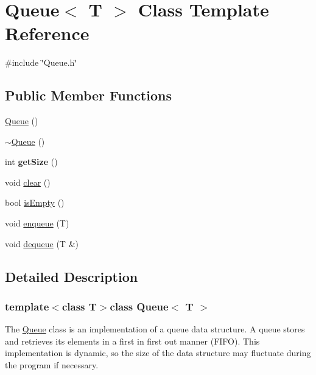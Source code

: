 \hypertarget{class_queue}{\section{Queue$<$ T $>$ Class Template Reference}
\label{class_queue}
}


{\ttfamily \#include \char`\"{}Queue.\-h\char`\"{}}

\subsection*{Public Member Functions}
\begin{DoxyCompactItemize}
\item 
\hyperlink{class_queue_af73bb29c868f7b37f369c668f114bd9f}{Queue} ()
\item 
\hyperlink{class_queue_aa7eef1b427e24555780505de20e9acbc}{$\sim$\-Queue} ()
\item 
\hypertarget{class_queue_aefc2563a28b93c8216ced448158ffebf}{int {\bfseries get\-Size} ()}\label{class_queue_aefc2563a28b93c8216ced448158ffebf}

\item 
void \hyperlink{class_queue_acb12e3d108397a77e412d43cdd0b2836}{clear} ()
\item 
bool \hyperlink{class_queue_a515bd72c9d7d2bc12add78c0d2e79762}{is\-Empty} ()
\item 
void \hyperlink{class_queue_a011d990957da9f9ab6de8956f7d839ea}{enqueue} (T)
\item 
void \hyperlink{class_queue_adb9c19e6c3cec9a761413bf0f8697d7f}{dequeue} (T \&)
\end{DoxyCompactItemize}


\subsection{Detailed Description}
\subsubsection*{template$<$class T$>$class Queue$<$ T $>$}

The \hyperlink{class_queue}{Queue} class is an implementation of a queue data structure. A queue stores and retrieves its elements in a first in first out manner (F\-I\-F\-O). This implementation is dynamic, so the size of the data structure may fluctuate during the program if necessary. 

